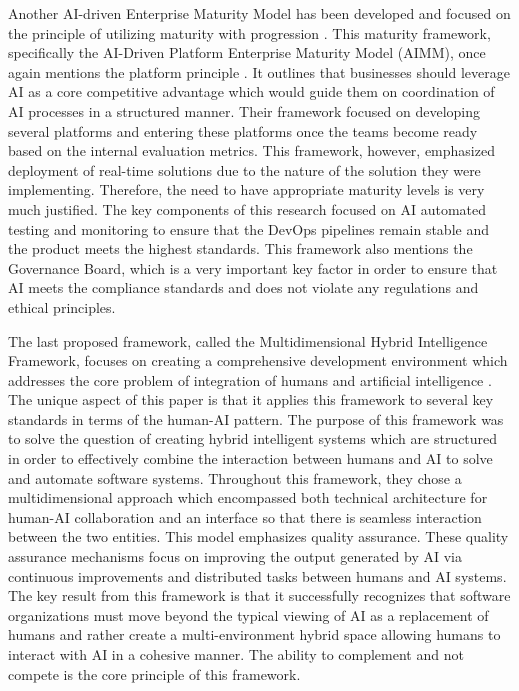 \documentclass[]{imc-inf}
\begin{document}
Another AI-driven Enterprise Maturity Model has been developed and focused on the principle of utilizing maturity with progression \citep{Ern2025}. This maturity framework, specifically the AI-Driven Platform Enterprise Maturity Model (AIMM), once again mentions the platform principle \citep{Yablonsky2021}. It outlines that businesses should leverage AI as a core competitive advantage which would guide them on coordination of AI processes in a structured manner. Their framework focused on developing several platforms and entering these platforms once the teams become ready based on the internal evaluation metrics. This framework, however, emphasized deployment of real-time solutions due to the nature of the solution they were implementing. Therefore, the need to have appropriate maturity levels is very much justified. The key components of this research focused on AI automated testing and monitoring to ensure that the DevOps pipelines remain stable and the product meets the highest standards. This framework also mentions the Governance Board, which is a very important key factor in order to ensure that AI meets the compliance standards and does not violate any regulations and ethical principles. 


The last proposed framework, called the Multidimensional Hybrid Intelligence Framework, focuses on creating a comprehensive development environment which addresses the core problem of integration of humans and artificial intelligence \citep{Sherson2023}. 
The unique aspect of this paper is that it applies this framework to several key standards in terms of the human-AI pattern. The purpose of this framework was to solve the question of creating hybrid intelligent systems which are structured in order to effectively combine the interaction between humans and AI to solve and automate software systems. Throughout this framework, they chose a multidimensional approach which encompassed both technical architecture for human-AI collaboration and an interface so that there is seamless interaction between the two entities. This model emphasizes quality assurance. These quality assurance mechanisms focus on improving the output generated by AI via continuous improvements and distributed tasks between humans and AI systems. 
The key result from this framework is that it successfully recognizes that software organizations must move beyond the typical viewing of AI as a replacement of humans and rather create a multi-environment hybrid space allowing humans to interact with AI in a cohesive manner. The ability to complement and not compete is the core principle of this framework.
\end{document}
